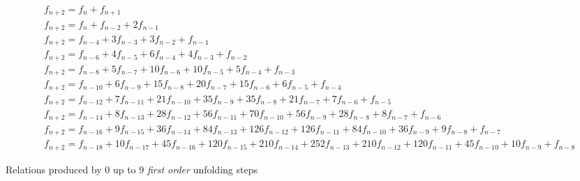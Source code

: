 \documentclass[a4paper,dottedtoc,headinclude,footinclude]{report} %
\theoremstyle{plain}
\begin{document}
    
    \begin{table}

        \begin{eqnarray}
            & f_{n + 2} = f_{n} + f_{n + 1} \\
            & f_{n + 2} = f_{n} + f_{n - 2} + 2 f_{n - 1}\\
            & f_{n + 2} = f_{n - 4} + 3 f_{n - 3} + 3 f_{n - 2} + f_{n - 1}\\
            & f_{n + 2} = f_{n - 6} + 4 f_{n - 5} + 6 f_{n - 4} + 4 f_{n - 3} + f_{n - 2}\\
            & f_{n + 2} = f_{n - 8} + 5 f_{n - 7} + 10 f_{n - 6} + 10 f_{n - 5} + 5 f_{n - 4} + f_{n - 3}\\
            & f_{n + 2} = f_{n - 10} + 6 f_{n - 9} + 15 f_{n - 8} + 20 f_{n - 7} + 15 f_{n - 6} + 6 f_{n - 5} + f_{n - 4}\\
            & f_{n + 2} = f_{n - 12} + 7 f_{n - 11} + 21 f_{n - 10} + 35 f_{n - 9} + 35 f_{n - 8} + 21 f_{n - 7} + 7 f_{n - 6} + f_{n - 5}\\
            & f_{n + 2} = f_{n - 14} + 8 f_{n - 13} + 28 f_{n - 12} + 56 f_{n - 11} + 70 f_{n - 10} + 56 f_{n - 9} + 28 f_{n - 8} + 8 f_{n - 7} + f_{n - 6}\\
            & f_{n + 2} = f_{n - 16} + 9 f_{n - 15} + 36 f_{n - 14} + 84 f_{n - 13} + 126 f_{n - 12} + 126 f_{n - 11} + 84 f_{n - 10} + 36 f_{n - 9} + 9 f_{n - 8} + f_{n - 7}\\
            & f_{n + 2} = f_{n - 18} + 10 f_{n - 17} + 45 f_{n - 16} + 120 f_{n - 15} + 210 f_{n - 14} + 252 f_{n - 13} + 210 f_{n - 12} + 120 f_{n - 11} + 45 f_{n - 10} + 10 f_{n - 9} + f_{n - 8}
            \end{eqnarray}

        \caption{Relations produced by $0$ up to $9$ \emph{first order} unfolding steps}
        \label{triangle:fib:first:order}
    \end{table}
    
\end{document}
